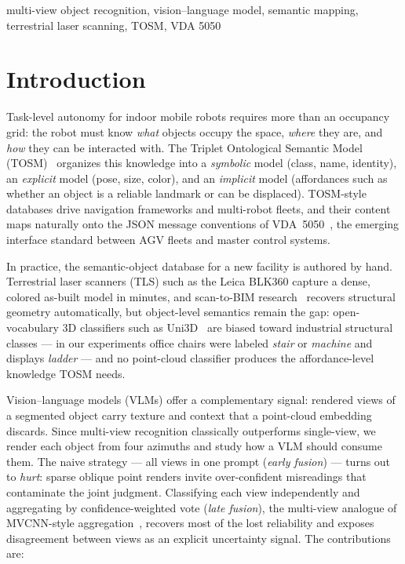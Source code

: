 \documentclass[conference]{IEEEtran}
\begin{document}
\begin{IEEEkeywords}
multi-view object recognition, vision--language model, semantic mapping,
terrestrial laser scanning, TOSM, VDA 5050
\end{IEEEkeywords}

\section{Introduction}
Task-level autonomy for indoor mobile robots requires more than an
occupancy grid: the robot must know \emph{what} objects occupy the space,
\emph{where} they are, and \emph{how} they can be interacted with. The
Triplet Ontological Semantic Model (TOSM)~\cite{joo2020tosm} organizes this
knowledge into a \emph{symbolic} model (class, name, identity), an
\emph{explicit} model (pose, size, color), and an \emph{implicit} model
(affordances such as whether an object is a reliable landmark or can be
displaced). TOSM-style databases drive navigation frameworks and multi-robot
fleets, and their content maps naturally onto the JSON message conventions
of VDA~5050~\cite{vda5050}, the emerging interface standard between AGV
fleets and master control systems.

In practice, the semantic-object database for a new facility is authored by
hand. Terrestrial laser scanners (TLS) such as the Leica BLK360 capture a
dense, colored as-built model in minutes, and scan-to-BIM
research~\cite{patraucean2015} recovers structural geometry automatically,
but object-level semantics remain the gap: open-vocabulary 3D classifiers
such as Uni3D~\cite{zhou2024uni3d} are biased toward industrial structural
classes --- in our experiments office chairs were labeled \emph{stair} or
\emph{machine} and displays \emph{ladder} --- and no point-cloud classifier
produces the affordance-level knowledge TOSM needs.

Vision--language models (VLMs) offer a complementary signal: rendered views
of a segmented object carry texture and context that a point-cloud embedding
discards. Since multi-view recognition classically outperforms single-view,
we render each object from four azimuths and study how a VLM should consume
them. The naive strategy --- all views in one prompt (\emph{early fusion})
--- turns out to \emph{hurt}: sparse oblique point renders invite
over-confident misreadings that contaminate the joint judgment. Classifying
each view independently and aggregating by confidence-weighted vote
(\emph{late fusion}), the multi-view analogue of MVCNN-style
aggregation~\cite{su2015mvcnn}, recovers most of the lost reliability and
exposes disagreement between views as an explicit uncertainty signal. The contributions are:
\end{document}
